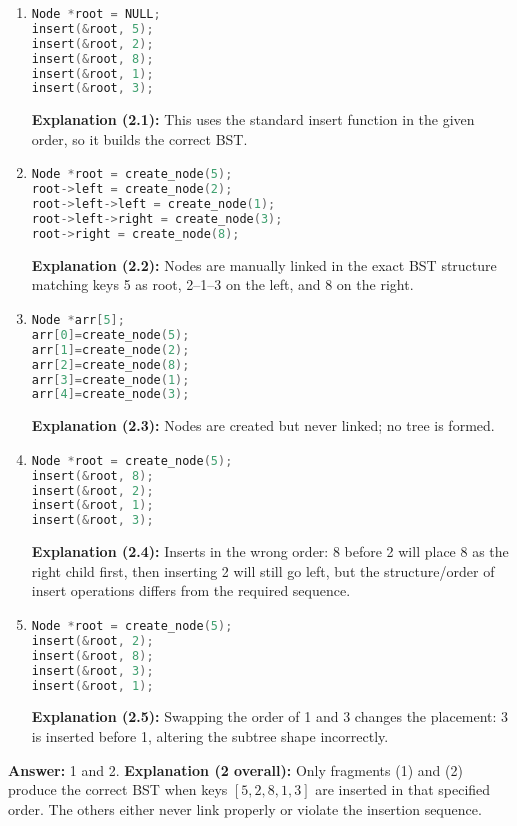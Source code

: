 \documentclass[12pt]{article}
\begin{document}
\begin{enumerate}[label=\arabic*.]
  \item
\begin{lstlisting}[language=C]
Node *root = NULL;
insert(&root, 5);
insert(&root, 2);
insert(&root, 8);
insert(&root, 1);
insert(&root, 3);
\end{lstlisting}
  \textbf{Explanation (2.1):} This uses the standard insert function in the given order, so it builds the correct BST.

  \item
\begin{lstlisting}[language=C]
Node *root = create_node(5);
root->left = create_node(2);
root->left->left = create_node(1);
root->left->right = create_node(3);
root->right = create_node(8);
\end{lstlisting}
  \textbf{Explanation (2.2):} Nodes are manually linked in the exact BST structure matching keys 5 as root, 2–1–3 on the left, and 8 on the right.

  \item
\begin{lstlisting}[language=C]
Node *arr[5];
arr[0]=create_node(5);
arr[1]=create_node(2);
arr[2]=create_node(8);
arr[3]=create_node(1);
arr[4]=create_node(3);
\end{lstlisting}
  \textbf{Explanation (2.3):} Nodes are created but never linked; no tree is formed.

  \item
\begin{lstlisting}[language=C]
Node *root = create_node(5);
insert(&root, 8);
insert(&root, 2);
insert(&root, 1);
insert(&root, 3);
\end{lstlisting}
  \textbf{Explanation (2.4):} Inserts in the wrong order: 8 before 2 will place 8 as the right child first, then inserting 2 will still go left, but the structure/order of insert operations differs from the required sequence.

  \item
\begin{lstlisting}[language=C]
Node *root = create_node(5);
insert(&root, 2);
insert(&root, 8);
insert(&root, 3);
insert(&root, 1);
\end{lstlisting}
  \textbf{Explanation (2.5):} Swapping the order of 1 and 3 changes the placement: 3 is inserted before 1, altering the subtree shape incorrectly.
\end{enumerate}

\noindent\textbf{Answer:} 1 and 2.  
\textbf{Explanation (2 overall):} Only fragments (1) and (2) produce the correct BST when keys \([5,2,8,1,3]\) are inserted in that specified order. The others either never link properly or violate the insertion sequence.
\end{document}
